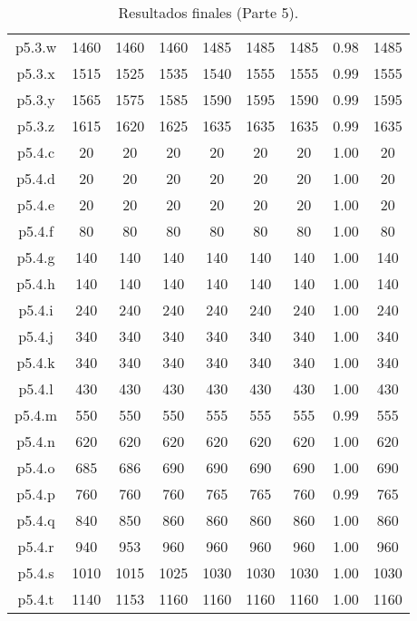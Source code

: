 \begin{table}
\begin{center}
\begin{tabular}{ |c|c|c|c|c|c|c|c|c| }
p5.3.w & 1460 & 1460 & 1460 & 1485 & 1485 & 1485 & 0.98 & 1485 \\
p5.3.x & 1515 & 1525 & 1535 & 1540 & 1555 & 1555 & 0.99 & 1555 \\
p5.3.y & 1565 & 1575 & 1585 & 1590 & 1595 & 1590 & 0.99 & 1595 \\
p5.3.z & 1615 & 1620 & 1625 & 1635 & 1635 & 1635 & 0.99 & 1635 \\
p5.4.c & 20 & 20 & 20 & 20 & 20 & 20 & 1.00 & 20 \\
p5.4.d & 20 & 20 & 20 & 20 & 20 & 20 & 1.00 & 20 \\
p5.4.e & 20 & 20 & 20 & 20 & 20 & 20 & 1.00 & 20 \\
p5.4.f & 80 & 80 & 80 & 80 & 80 & 80 & 1.00 & 80 \\
p5.4.g & 140 & 140 & 140 & 140 & 140 & 140 & 1.00 & 140 \\
p5.4.h & 140 & 140 & 140 & 140 & 140 & 140 & 1.00 & 140 \\
p5.4.i & 240 & 240 & 240 & 240 & 240 & 240 & 1.00 & 240 \\
p5.4.j & 340 & 340 & 340 & 340 & 340 & 340 & 1.00 & 340 \\
p5.4.k & 340 & 340 & 340 & 340 & 340 & 340 & 1.00 & 340 \\
p5.4.l & 430 & 430 & 430 & 430 & 430 & 430 & 1.00 & 430 \\
p5.4.m & 550 & 550 & 550 & 555 & 555 & 555 & 0.99 & 555 \\
p5.4.n & 620 & 620 & 620 & 620 & 620 & 620 & 1.00 & 620 \\
p5.4.o & 685 & 686 & 690 & 690 & 690 & 690 & 1.00 & 690 \\
p5.4.p & 760 & 760 & 760 & 765 & 765 & 760 & 0.99 & 765 \\
p5.4.q & 840 & 850 & 860 & 860 & 860 & 860 & 1.00 & 860 \\
p5.4.r & 940 & 953 & 960 & 960 & 960 & 960 & 1.00 & 960 \\
p5.4.s & 1010 & 1015 & 1025 & 1030 & 1030 & 1030 & 1.00 & 1030 \\
p5.4.t & 1140 & 1153 & 1160 & 1160 & 1160 & 1160 & 1.00 & 1160 \\
\hline
\end{tabular}
\end{center}
\caption{Resultados finales (Parte 5).}
\label{tab:resultadosFinales5}
\end{table}



